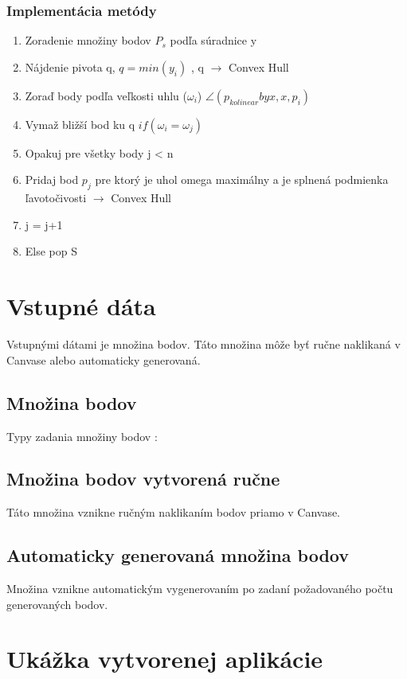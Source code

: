 \documentclass[12pt]{article}
\begin{document}
\subsubsection{Implementácia metódy}
\begin{enumerate}
	\item Zoradenie množiny bodov $P_s$ podľa súradnice y 
	\item Nájdenie pivota q, $ q = min(y_i)$ , q $\to$ Convex Hull
	\item Zoraď body podľa veľkosti uhlu  ($\omega_i$) $ \angle(p_{kolinear} by x, x, p_i)$
	\item Vymaž bližší bod ku q $ if(\omega_i = \omega_j) $
	\item Opakuj pre všetky body j < n
	\item Pridaj bod $p_j$ pre ktorý je uhol omega maximálny a je splnená podmienka ľavotočivosti  $\to$ Convex Hull
	\item \hspace {1.5cm} j = j+1
	\item Else pop S	
\end{enumerate}


\section{Vstupné dáta}
Vstupnými dátami je množina bodov. Táto množina môže byť ručne naklikaná v Canvase alebo automaticky generovaná.
\subsection{Množina bodov}
Typy zadania množiny bodov : 

\subsection{Množina bodov vytvorená ručne}
Táto množina vznikne ručným naklikaním bodov priamo v Canvase.

\subsection{Automaticky generovaná množina bodov}
Množina vznikne automatickým vygenerovaním po zadaní požadovaného počtu generovaných bodov.

\section{Ukážka vytvorenej aplikácie}
\end{document}
